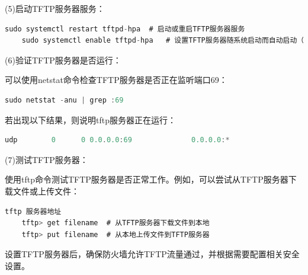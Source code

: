     (5)启动TFTP服务器服务：
    
     \begin{lstlisting}[language=rust]
    sudo systemctl restart tftpd-hpa  # 启动或重启TFTP服务器服务
    sudo systemctl enable tftpd-hpa   # 设置TFTP服务器随系统启动而自动启动（可选）	
     \end{lstlisting}
    
    (6)验证TFTP服务器是否运行：
    
    可以使用netstat命令检查TFTP服务器是否正在监听端口69：
    
    \begin{lstlisting}[language=rust]
    sudo netstat -anu | grep :69
    \end{lstlisting}
    
    若出现以下结果，则说明tftp服务器正在运行：
    
    \begin{lstlisting}[language=rust]
    udp        0      0 0.0.0.0:69              0.0.0.0:* 
    \end{lstlisting}
    
    (7)测试TFTP服务器：
    
    使用tftp命令测试TFTP服务器是否正常工作。例如，可以尝试从TFTP服务器下载文件或上传文件：
    
    \begin{lstlisting}[language=rust]
	tftp 服务器地址
	tftp> get filename  # 从TFTP服务器下载文件到本地
	tftp> put filename  # 从本地上传文件到TFTP服务器
    \end{lstlisting}
    
    设置TFTP服务器后，确保防火墙允许TFTP流量通过，并根据需要配置相关安全设置。